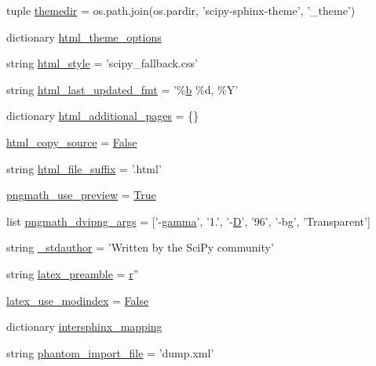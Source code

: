 \begin{DoxyCompactItemize}
\item 
tuple \hyperlink{namespaceconf_a3982c0155434954df650226c6d832521}{themedir} = os.\+path.\+join(os.\+pardir, 'scipy-\/sphinx-\/theme', '\+\_\+theme')
\item 
dictionary \hyperlink{namespaceconf_a59fb37ca5915e18823f5f433129b35ec}{html\+\_\+theme\+\_\+options}
\item 
string \hyperlink{namespaceconf_a5622a8722272baed29b41d8771ecbe3c}{html\+\_\+style} = 'scipy\+\_\+fallback.\+css'
\item 
string \hyperlink{namespaceconf_a65371021a0b434251045fdb650f90b87}{html\+\_\+last\+\_\+updated\+\_\+fmt} = '\%\hyperlink{gen__mat5files_8m_a7b38767b3b6a8dae167e5afa4fc340b0}{b} \%d, \%Y'
\item 
dictionary \hyperlink{namespaceconf_a3829515111ba6a7fd25627567430b0e5}{html\+\_\+additional\+\_\+pages} = \{\}
\item 
\hyperlink{namespaceconf_a771fe07e57b9dde77561c2dcb1f16204}{html\+\_\+copy\+\_\+source} = \hyperlink{libqhull_8h_a306ebd41c0cd1303b1372c6153f0caf8}{False}
\item 
string \hyperlink{namespaceconf_a1baa1b929fcf352b86f395c155f18fe9}{html\+\_\+file\+\_\+suffix} = '.html'
\item 
\hyperlink{namespaceconf_a961bac4a1aae8c9a69ef34c1b0d92e67}{pngmath\+\_\+use\+\_\+preview} = \hyperlink{libqhull_8h_add3ca9eefe3b5b754426f51d3043e579}{True}
\item 
list \hyperlink{namespaceconf_ab3a89593e7b7c63c11c3921f4f2aad4d}{pngmath\+\_\+dvipng\+\_\+args} = \mbox{[}'-\/\hyperlink{gamma__fort_8f_a16d7e3244b98c48f1960c796bde8b92f}{gamma}', '1.', '-\/\hyperlink{odrpack_8h_a7dae6ea403d00f3687f24a874e67d139}{D}', '96', '-\/bg', 'Transparent'\mbox{]}
\item 
string \hyperlink{namespaceconf_a519aa7ef43ac5c9d622ced8a6dfd613c}{\+\_\+stdauthor} = 'Written by the Sci\+Py community'
\item 
string \hyperlink{namespaceconf_a71183e61f5009895b3ffe041296e6af9}{latex\+\_\+preamble} = \hyperlink{indexexpr_8h_ac434fd11cc2493608d8d91424d60c17e}{r}''
\item 
\hyperlink{namespaceconf_acaffe3a51cfe6aaebb3becbb1306a675}{latex\+\_\+use\+\_\+modindex} = \hyperlink{libqhull_8h_a306ebd41c0cd1303b1372c6153f0caf8}{False}
\item 
dictionary \hyperlink{namespaceconf_a8375f4f963de3ac8026eaa9beced9564}{intersphinx\+\_\+mapping}
\item 
string \hyperlink{namespaceconf_ad772d138ab2c222323364557f70434f6}{phantom\+\_\+import\+\_\+file} = 'dump.\+xml'

\end{DoxyCompactItemize}
